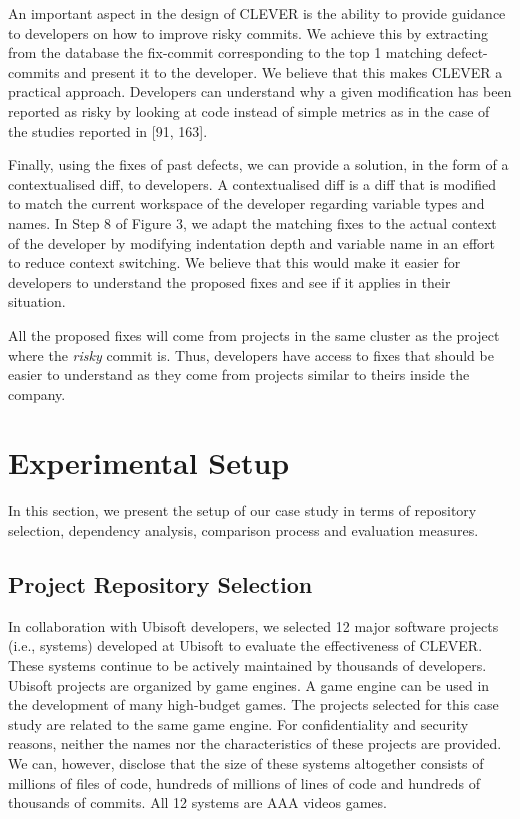 \documentclass[12pt]{report}
\begin{document}
An important aspect in the design of CLEVER is the ability to provide
guidance to developers on how to improve risky commits. We achieve this
by extracting from the database the fix-commit corresponding to the top
1 matching defect-commits and present it to the developer. We believe
that this makes CLEVER a practical approach. Developers can understand
why a given modification has been reported as risky by looking at code
instead of simple metrics as in the case of the studies reported in
{[}91, 163{]}.

Finally, using the fixes of past defects, we can provide a solution, in
the form of a contextualised diff, to developers. A contextualised diff
is a diff that is modified to match the current workspace of the
developer regarding variable types and names. In Step 8 of Figure 3, we
adapt the matching fixes to the actual context of the developer by
modifying indentation depth and variable name in an effort to reduce
context switching. We believe that this would make it easier for
developers to understand the proposed fixes and see if it applies in
their situation.

All the proposed fixes will come from projects in the same cluster as
the project where the \emph{risky} commit is. Thus, developers have
access to fixes that should be easier to understand as they come from
projects similar to theirs inside the company.

\section{Experimental Setup}\label{sec:exp}

In this section, we present the setup of our case study in terms of
repository selection, dependency analysis, comparison process and
evaluation measures.

\subsection{Project Repository Selection}\label{sec:rep}

In collaboration with Ubisoft developers, we selected 12 major software
projects (i.e., systems) developed at Ubisoft to evaluate the
effectiveness of CLEVER. These systems continue to be actively
maintained by thousands of developers. Ubisoft projects are organized by
game engines. A game engine can be used in the development of many
high-budget games. The projects selected for this case study are related
to the same game engine. For confidentiality and security reasons,
neither the names nor the characteristics of these projects are
provided. We can, however, disclose that the size of these systems
altogether consists of millions of files of code, hundreds of millions
of lines of code and hundreds of thousands of commits. All 12 systems
are AAA videos games.
\end{document}
